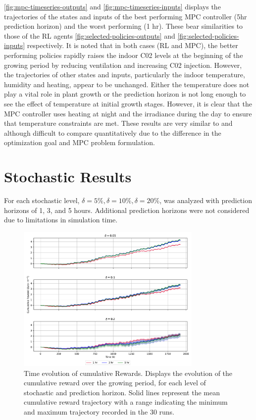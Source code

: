 \autoref{fig:mpc-timeseries-outputs} and \autoref{fig:mpc-timeseries-inputs} displays the trajectories of the states and inputs of the best performing MPC controller (5hr prediction horizon) and the worst performing (1 hr). These bear similarities to those of the RL agents \autoref{fig:selected-policies-outputs} and \autoref{fig:selected-policies-inputs} respectively. It is noted that in both cases (RL and MPC), the better performing policies rapidly raises the indoor C02 levels at the beginning of the growing period by reducing ventilation and increasing C02 injection. However, the trajectories of other states and inputs, particularly the indoor temperature, humidity and heating, appear to be unchanged. Either the temperature does not play a vital role in plant growth or the prediction horizon is not long enough to see the effect of temperature at initial growth stages. However, it is clear that the MPC controller uses heating at night and the irradiance during the day to ensure that temperature constraints are met. These results are very similar to \cite{morcegoReinforcementLearningModel2023} and \cite{boersmaRobustSamplebasedModel2022} although difficult to compare quantitatively due to the difference in the optimization goal and MPC problem formulation.


\section{Stochastic Results}
For each stochastic level, $\delta = 5\%, \delta = 10\%, \delta = 20\%$, was analyzed with prediction horizons of 1, 3, and 5 hours. Additional prediction horizons were not considered due to limitations in simulation time. 

\begin{figure}[H]
	\centering
	\includegraphics[width=0.8\textwidth]{figures/stochastic_mpc_rewards_time.pdf}
	\caption{Time evolution of cumulative Rewards. Displays the evolution of the cumulative reward over the growing period, for each level of stochastic and prediction horizon. Solid lines represent the mean cumulative reward trajectory with a range indicating the minimum and maximum trajectory recorded in the 30 runs.}
	\label{fig:stochastic-mpc-rewards-time}
\end{figure}

